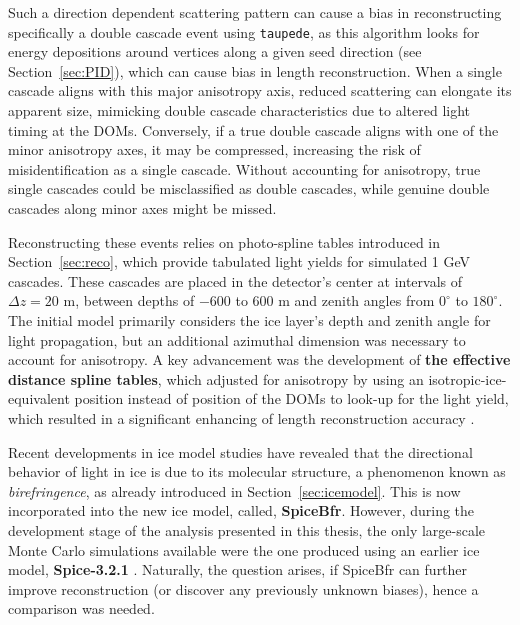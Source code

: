 Such a direction dependent scattering pattern can cause a bias in reconstructing specifically a double cascade event using \texttt{taupede}, as this algorithm looks for energy depositions around vertices along a given seed direction (see Section~\ref{sec:PID}), which can cause bias in length reconstruction. When a single cascade aligns with this major anisotropy axis, reduced scattering can elongate its apparent size, mimicking double cascade characteristics due to altered light timing at the DOMs. Conversely, if a true double cascade aligns with one of the minor anisotropy axes, it may be compressed, increasing the risk of misidentification as a single cascade. Without accounting for anisotropy, true single cascades could be misclassified as double cascades, while genuine double cascades along minor axes might be missed.

Reconstructing these events relies on photo-spline tables introduced in Section~\ref{sec:reco}, which provide tabulated light yields for simulated 1 GeV cascades. These cascades are placed in the detector's center at intervals of $\Delta z = 20$ m, between depths of $-600$ to $600$ m and zenith angles from $0^{\circ}$ to $180^{\circ}$. The initial model primarily considers the ice layer's depth and zenith angle for light propagation, but an additional azimuthal dimension was necessary to account for anisotropy. A key advancement was the development of \textbf{the effective distance spline tables}, which adjusted for anisotropy by using an isotropic-ice-equivalent position instead of position of the DOMs to look-up for the light yield, which resulted in a  significant enhancing of length reconstruction accuracy .

Recent developments in ice model studies have revealed that the directional behavior of light in ice is due to its molecular structure, a phenomenon known as \emph{birefringence}, as already introduced in Section~\ref{sec:icemodel}. This is now incorporated into the new ice model, called, \textbf{SpiceBfr}. However, during the development stage of the analysis presented in this thesis, the only large-scale Monte Carlo simulations available were the one produced using an earlier ice model, \textbf{Spice-3.2.1} . Naturally, the question arises, if SpiceBfr can further improve reconstruction (or discover any previously unknown biases), hence a comparison was needed. 


